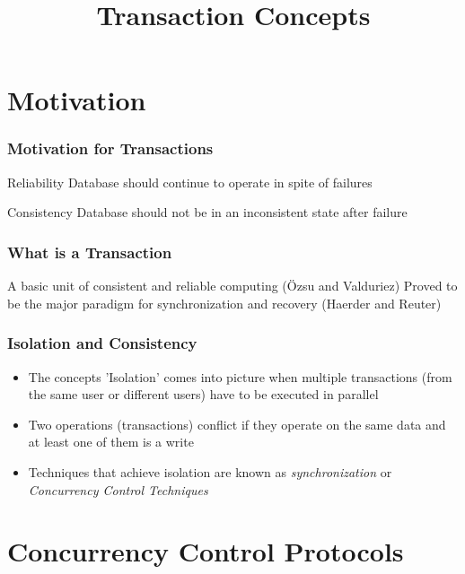 \documentclass[12]{beamer}
\title{Transaction Concepts}
\date
\begin{document}
\maketitle

\section{Motivation}

\begin{frame}
  \frametitle{Motivation for Transactions}
  \begin{block}{Reliability}
    Database should continue to operate in spite of failures
  \end{block}
  \begin{block}{Consistency}
    Database should not be in an inconsistent state after failure
  \end{block}
\end{frame}

%
%
\begin{frame}
  \frametitle{What is a Transaction}
  \begin{definition}
    A basic unit of consistent and reliable computing (\"Ozsu and Valduriez)
    Proved to be the major paradigm for synchronization and recovery (Haerder and Reuter)
  \end{definition}
\vspace{5mm}
\end{frame}

\begin{frame}
  \frametitle{Isolation and Consistency}
  \begin{itemize}
    \item   The concepts 'Isolation' comes into picture when multiple transactions (from the same user or different users) have to be executed in parallel
    \item Two operations (transactions) conflict if they operate on the same data and at least one of them is a write
    \item Techniques that achieve isolation are known as \textit{synchronization} or \textit{Concurrency Control Techniques}
  \end{itemize}
\end{frame}

\section{Concurrency Control Protocols}
\end{document}
